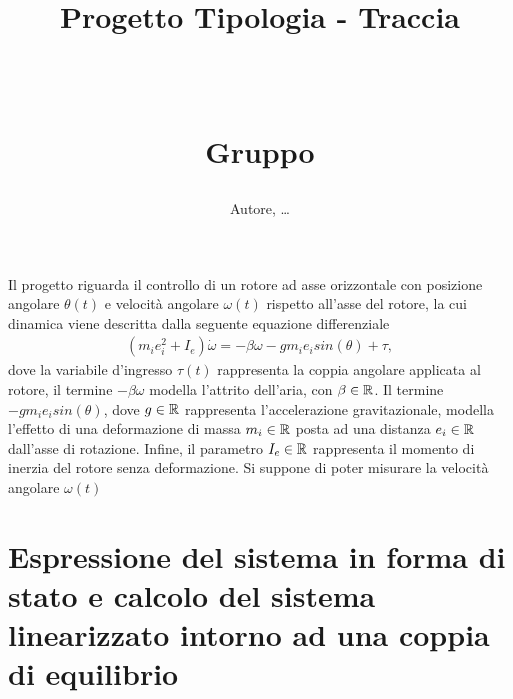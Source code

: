 \documentclass[a4paper, 11pt]{article}
\title{ \vspace{-1in}
		\huge \strut \coursename \strut 
		\\
		\Large  \strut Progetto Tipologia \tipology - Traccia \trace 
		\\
		\Large  \strut \projectname\strut
		\\
		\Large  \strut Gruppo \group\strut
		\vspace{-0.4cm}
}
\author{Autore, \dots}
\date{}
\begin{document}
\maketitle
\vspace{-0.5cm}

Il progetto riguarda il controllo di un rotore ad asse orizzontale con posizione angolare $ \theta (t)$ e velocità angolare $\omega (t)$ rispetto
all’asse del rotore, la cui dinamica viene descritta dalla seguente equazione differenziale 
%
\begin{subequations}\label{eq:system}
\begin{align}
	(m_i e_i^2+I_e) \dot \omega = - \beta \omega - g m_i e_i sin(\theta) + \tau,
\end{align}
\end{subequations}
%
dove la variabile d'ingresso $\tau (t)$ rappresenta la coppia angolare applicata al rotore, il termine $-\beta \omega$ modella l'attrito dell'aria, con $\beta \in \Bbb R$. Il termine $- g m_i e_i sin(\theta)$, dove $g \in \Bbb R$ rappresenta l'accelerazione gravitazionale, modella l'effetto di una deformazione di massa $m_i \in 
\Bbb R $ posta ad una distanza $e_i \in \Bbb R $ dall'asse di rotazione. Infine, il parametro $I_e \in \Bbb R$ rappresenta il momento di inerzia del rotore senza deformazione. Si suppone di poter misurare la velocità angolare $\omega (t)$


\section{Espressione del sistema in forma di stato e calcolo del sistema linearizzato intorno ad una coppia di equilibrio}
\end{document}
